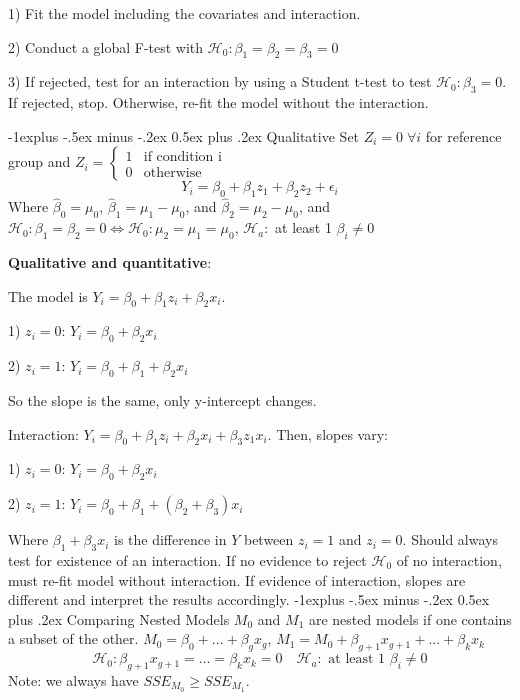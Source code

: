 \documentclass[8pt,landscape]{article}
\makeatletter
\renewcommand{\subsection}{\@startsection{subsection}{2}{0mm}%
                                {-1explus -.5ex minus -.2ex}%
                                {0.5ex plus .2ex}%
                                {\normalfont\normalsize\bfseries}}
\makeatother
\begin{document}
\begin{multicols}{3}
1) Fit the model including the covariates and interaction.

2) Conduct a global F-test with $\mathcal{H}_0 : \beta_1 = \beta_2 = \beta_3 = 0$

3) If rejected, test for an interaction by using a Student t-test to test $\mathcal{H}_0 : \beta_3 = 0$. If rejected, stop. Otherwise, re-fit the model without the interaction.

\subsection{Qualitative}
Set $Z_i = 0 \; \forall i$ for reference group and $Z_i =\left\{ \begin{matrix} 1 &\text{if condition i} \\ 0 & \text{otherwise} \end{matrix} \right.$
$$Y_i = \beta_0 + \beta_1 z_1 + \beta_2z_2 + \epsilon_i$$
Where $\hat{\beta}_0 = \mu_0$, $\hat{\beta}_1 = \mu_1 -\mu_0$, and $\hat{\beta}_2 = \mu_2- \mu_0$, and $\mathcal{H}_0 : \beta_1 = \beta_2 = 0 \iff \mathcal{H}_0 :\mu_2 = \mu_1 = \mu_0$, $\mathcal{H}_a:$ at least 1 $\beta_i\neq 0$

\textbf{Qualitative and quantitative}:

The model is $Y_i = \beta_0 + \beta_1z_i + \beta_2 x_i$. 

1) $z_i = 0$: $Y_i = \beta_0 + \beta_2x_i$

2) $z_i = 1$: $Y_i = \beta_0 + \beta_1 + \beta_2x_i$

So the slope is the same, only y-intercept changes.

Interaction: $Y_i = \beta_0 + \beta_1z_i + \beta_2 x_i + \beta_3 z_1 x_i$. Then, slopes vary:

1) $z_i = 0$: $Y_i = \beta_0 + \beta_2x_i$

2) $z_i = 1$: $Y_i = \beta_0 + \beta_1 + (\beta_2 + \beta_3)x_i$

Where $\beta_1 + \beta_3 x_i$ is the difference in $Y$ between $z_i=1$ and $z_i = 0$. Should always test for existence of an interaction.
If no evidence to reject $\mathcal{H}_0$ of no interaction, must re-fit model without interaction.
If evidence of interaction, slopes are different and interpret the results accordingly.
\subsection{Comparing Nested Models}
$M_0$ and $M_1$ are nested models if one contains a subset of the other.
$M_0 = \beta_0+...+ \beta_gx_g$, $M_1 = M_0+ \beta_{g+1}x_{g+1}+...+\beta_kx_k$
$$\mathcal{H}_0: \beta_{g+1}x_{g+1} = ...=\beta_kx_k=0 \quad \mathcal{H}_a : \text{ at least 1 } \beta_i\neq 0$$
Note: we always have $SSE_{M_0}\geq SSE_{M_1} $. 


\end{multicols}
\end{document}
